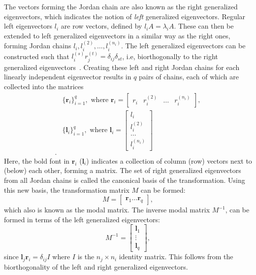 \documentclass[../main.tex]{subfiles}
\begin{document}
The vectors forming the Jordan chain are also known as the right generalized eigenvectors, which indicates the notion of \textit{left} generalized eigenvectors. Regular left eigenvectors $l_i$ are row vectors, defined by $l_iA = \lambda_iA$. These can then be extended to left generalized eigenvectors in a similar way as the right ones, forming Jordan chains $l_i, l_i^{(2)}, \dots, l_i^{(n_i)}$. The left generalized eigenvectors can be constructed such that $l_i^{(s)}r_j^{(t)}=\delta_{ij}\delta_{st}$, i.e, biorthogonally to the right generalized eigenvectors~\cite{nonHermrev}. Creating these left and right Jordan chains for each linearly independent eigenvector results in $q$ pairs of chains, each of which are collected into the matrices
\begin{equation}
    \begin{aligned}
        &\{\boldsymbol{r}_i\}_{i=1}^q, \text{ where }\boldsymbol{r}_i = \begin{bmatrix}r_i&r_i^{(2)}&\dots &r_i^{(n_i)}\end{bmatrix},\\
        &\{\boldsymbol{l}_i\}_{i=1}^q, \text{ where }\boldsymbol{l}_i = \begin{bmatrix}l_i\\ l_i^{(2)}\\\dots \\ l_i^{(n_i)}\end{bmatrix}\\.
    \end{aligned}
\end{equation}
Here, the bold font in $\boldsymbol{r}_i$ ($\boldsymbol{l}_i$) indicates a collection of column (row) vectors next to (below) each other, forming a matrix. The set of right generalized eigenvectors from all Jordan chains is called the canonical basis of the transformation. Using this new basis, the transformation matrix $M$ can be formed:
\begin{equation}\label{chofba}
    M = \begin{bmatrix}\boldsymbol{r}_1 \dots \boldsymbol{r}_q\end{bmatrix},
\end{equation}
which also is known as the modal matrix. The inverse modal matrix $M^{-1}$, can be formed in terms of the left generalized eigenvectors: 
\begin{equation}\label{chofbaleft}
    M^{-1} = \begin{bmatrix}\boldsymbol{l}_1\\ \vdots \\ \boldsymbol{l}_q\end{bmatrix},
\end{equation}
since $\boldsymbol{l}_j \boldsymbol{r}_i = \delta_{ij}I$ where $I$ is the $n_j\times n_i$ identity matrix. This follows from the biorthogonality of the left and right generalized eigenvectors.
\end{document}
